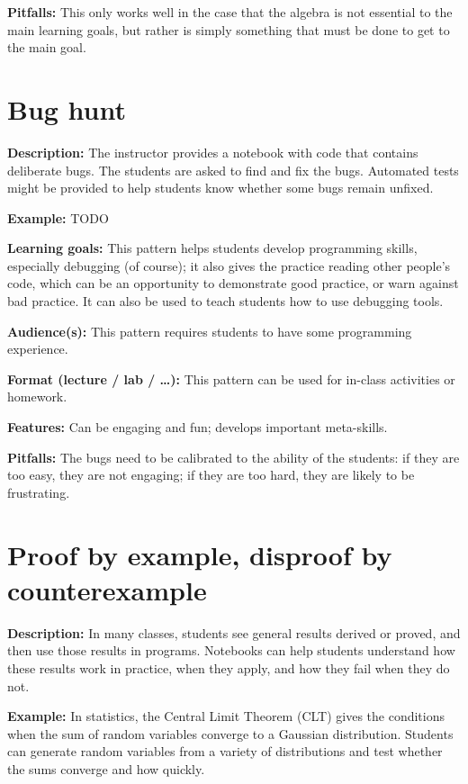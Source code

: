 \documentclass[]{book}
\begin{document}
\textbf{Pitfalls:} This only works well in the case that the algebra is
not essential to the main learning goals, but rather is simply something
that must be done to get to the main goal.

\section{Bug hunt}\label{bug-hunt}

\textbf{Description:} The instructor provides a notebook with code that
contains deliberate bugs. The students are asked to find and fix the
bugs. Automated tests might be provided to help students know whether
some bugs remain unfixed.

\textbf{Example:} TODO

\textbf{Learning goals:} This pattern helps students develop programming
skills, especially debugging (of course); it also gives the practice
reading other people's code, which can be an opportunity to demonstrate
good practice, or warn against bad practice. It can also be used to
teach students how to use debugging tools.

\textbf{Audience(s):} This pattern requires students to have some
programming experience.

\textbf{Format (lecture / lab / \ldots{}):} This pattern can be used for
in-class activities or homework.

\textbf{Features:} Can be engaging and fun; develops important
meta-skills.

\textbf{Pitfalls:} The bugs need to be calibrated to the ability of the
students: if they are too easy, they are not engaging; if they are too
hard, they are likely to be frustrating.

\hypertarget{proof-by-example-disproof-by-counterexample}{\section{Proof
by example, disproof by
counterexample}\label{proof-by-example-disproof-by-counterexample}}

\textbf{Description:} In many classes, students see general results
derived or proved, and then use those results in programs. Notebooks can
help students understand how these results work in practice, when they
apply, and how they fail when they do not.

\textbf{Example:} In statistics, the Central Limit Theorem (CLT) gives
the conditions when the sum of random variables converge to a Gaussian
distribution. Students can generate random variables from a variety of
distributions and test whether the sums converge and how quickly.
\end{document}
